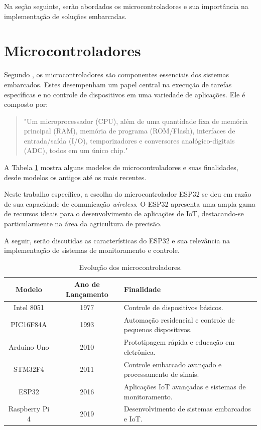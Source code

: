 Na seção seguinte, serão abordados os microcontroladores e sua importância na implementação de soluções embarcadas.

\section{Microcontroladores}

Segundo \textcite{lee2008cyber}, os microcontroladores são componentes essenciais dos sistemas embarcados. Estes desempenham um papel central na execução de tarefas específicas e no controle de dispositivos em uma variedade de aplicações. Ele é composto por:

\begin{quote}
  "Um microprocessador (CPU), além de uma quantidade fixa de memória principal (RAM), memória de programa (ROM/Flash),  interfaces de entrada/saída (I/O), temporizadores e conversores analógico-digitais (ADC), todos em um único chip." \parencite{Mazid_microcontrolador2011}
\end{quote}

A Tabela \ref{tab:evolucao_microcontroladores} mostra alguns modelos de microcontroladores e suas finalidades, desde modelos os antigos até os mais recentes.

Neste trabalho específico, a escolha do microcontrolador ESP32 se deu em razão de sua capacidade de comunicação \textit{wireless}. O ESP32 apresenta uma ampla gama de recursos ideais para o desenvolvimento de aplicações de IoT, destacando-se particularmente na área da agricultura de precisão.

A seguir, serão discutidas as características do ESP32 e sua relevância  na implementação de sistemas de monitoramento e controle.

\begin{table}[!htb]
\caption{Evolução dos microcontroladores.} \label{tab:evolucao_microcontroladores}
\begin{tabularx}{\textwidth}{|c|c|X|} \hline
\textbf{Modelo} & \textbf{Ano de Lançamento} & \textbf{Finalidade} \\ \hline
Intel 8051 & 1977 & Controle de dispositivos básicos.  \parencite{8051_usage} \\ \hline
PIC16F84A & 1993 & Automação residencial e controle de pequenos dispositivos. \parencite{PIC16F84A_usage} \\ \hline
Arduino Uno & 2010 & Prototipagem rápida e educação em eletrônica. \parencite{Arduino_usage} \\ \hline
STM32F4 & 2011 & Controle embarcado avançado e processamento de sinais. \parencite{STM32F4_usage} \\ \hline
ESP32 & 2016 & Aplicações IoT avançadas e sistemas de monitoramento. \parencite{ESP32_usage} \\ \hline
Raspberry Pi 4 & 2019 & Desenvolvimento de sistemas embarcados e IoT.  \parencite{RaspberryPi4_usage} \\ \hline
\end{tabularx}
\end{table}

